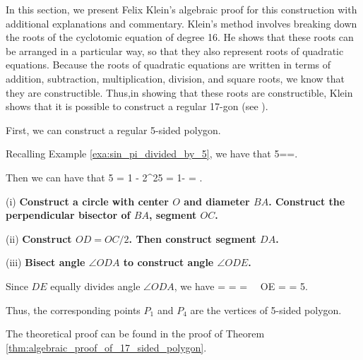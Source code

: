In this section, we present Felix Klein's algebraic proof for this construction with additional explanations and commentary. Klein's method involves breaking down the roots of the cyclotomic equation of degree 16. He shows that these roots can be arranged in a particular way, so that they also represent roots of quadratic equations. Because the roots of quadratic equations are written in terms of addition, subtraction, multiplication, division, and square roots, we know that they are constructible. Thus,in showing that these roots are constructible, Klein shows that it is possible to construct a regular 17-gon (see \cite{Klein_1897}).

First, we can construct a regular 5-sided polygon.

\begin{example}
Recalling Example \ref{exa:sin_pi_divided_by_5}, we have that
\be
\sin\frac{\pi}5==.
\ee

Then we can have that
\be
\cos \frac{2\pi}5 = 1 - 2\sin^2\frac{\pi}5 = 1-  = .
\ee


\ben
\item [(i)] {\bf Construct a circle with center $O$ and diameter $BA$. Construct the perpendicular bisector of $BA$, segment $OC$.}
\item [(ii)] {\bf Construct $OD = OC/2$. Then construct segment $DA$.}
\item [(iii)] {\bf Bisect angle $\angle ODA$ to construct angle $\angle ODE$.}

Since $DE$ equally divides angle $\angle ODA$, we have
\be
{} =  =   =  \ \ra \ OE =  = \cos \frac{2\pi}5.
\ee

Thus, the corresponding points $P_1$ and $P_4$ are the vertices of 5-sided polygon.

The theoretical proof can be found in the proof of Theorem \ref{thm:algebraic_proof_of_17_sided_polygon}.


\end{example}
